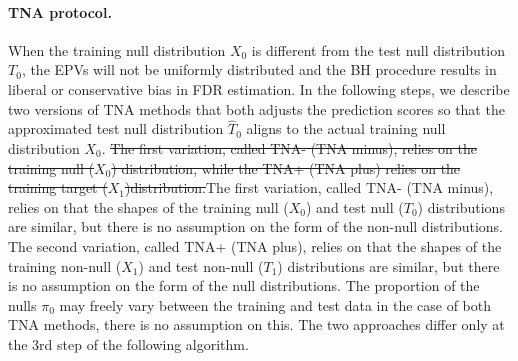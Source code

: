 \documentclass{article}
\newcommand{\correction}[2]{{\color{red}\sout{#1}}{\color{red}#2}}
\begin{document}
\paragraph{TNA protocol.} When the training null distribution $X_0$ is different from the test null distribution $T_0$, the EPVs will not be uniformly distributed and the BH procedure results in liberal or conservative bias in FDR estimation. In the following steps, we describe two versions of TNA methods that both adjusts the prediction scores so that the approximated test null distribution $\hat{T}_0$ aligns to the actual training null distribution $X_0$. \correction{The first variation, called TNA- (TNA minus), relies on the training null ($X_0$) distribution, while the TNA+ (TNA plus) relies on the training target ($X_1$)distribution.}{The first variation, called TNA- (TNA minus), relies on that the shapes of the training null ($X_0$) and test null ($T_0$) distributions are similar, but there is no assumption on the form of the non-null distributions. The second variation, called TNA+ (TNA plus), relies on that the shapes of the training non-null ($X_1$) and test non-null ($T_1$) distributions are similar, but there is no assumption on the form of the null distributions. The proportion of the nulls $\pi_0$ may freely vary between the training and test data in the case of both TNA methods, there is no assumption on this.} The two approaches differ only at the 3rd step of the following algorithm. 
\end{document}
